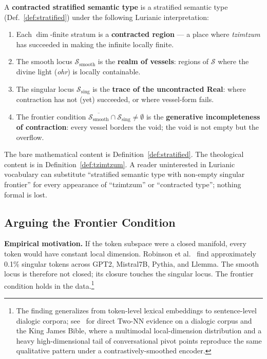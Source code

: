 \begin{definition}\label{def:tzimtzum}
A \textbf{contracted stratified semantic type} is a stratified semantic type (Def.~\ref{def:stratified}) under the following Lurianic interpretation:
\begin{enumerate}
    \item Each $\dim$-finite stratum is a \textbf{contracted region} — a place where \emph{tzimtzum} has succeeded in making the infinite locally finite.
    \item The smooth locus $\mathcal{S}_{\mathrm{smooth}}$ is the \textbf{realm of vessels}: regions of $\mathcal{S}$ where the divine light (\emph{ohr}) is locally containable.
    \item The singular locus $\mathcal{S}_{\mathrm{sing}}$ is the \textbf{trace of the uncontracted Real}: where contraction has not (yet) succeeded, or where vessel-form fails.
    \item The frontier condition $\overline{\mathcal{S}_{\mathrm{smooth}}} \cap \mathcal{S}_{\mathrm{sing}} \neq \emptyset$ is the \textbf{generative incompleteness of contraction}: every vessel borders the void; the void is not empty but the overflow.
\end{enumerate}
\end{definition}

The bare mathematical content is Definition~\ref{def:stratified}. The theological content is in Definition~\ref{def:tzimtzum}. A reader uninterested in Lurianic vocabulary can substitute ``stratified semantic type with non-empty singular frontier'' for every appearance of ``tzimtzum'' or ``contracted type''; nothing formal is lost.

\subsection{Arguing the Frontier Condition}

\textbf{Empirical motivation.} If the token subspace were a closed manifold, every token would have constant local dimension. Robinson et al.~\cite{robinson2025token} find approximately 0.1\% singular tokens across GPT2, Mistral7B, Pythia, and Llemma. The smooth locus is therefore not closed; its closure touches the singular locus. The frontier condition holds in the data.\footnote{The finding generalizes from token-level lexical embeddings to sentence-level dialogic corpora; see~\cite{poernomo2026strata} for direct Two-NN evidence on a dialogic corpus and the King James Bible, where a multimodal local-dimension distribution and a heavy high-dimensional tail of conversational pivot points reproduce the same qualitative pattern under a contrastively-smoothed encoder.}


